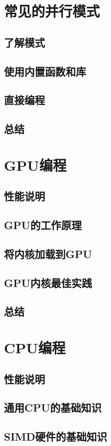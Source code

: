 \documentclass[11pt,a4paper,UTF8]{ctexart}
\begin{document}
	\section{常见的并行模式}
		\subsection{了解模式}
		\subsection{使用内置函数和库}
		\subsection{直接编程}
		\subsection{总结}
	\section{GPU编程}
		\subsection{性能说明}
		\subsection{GPU的工作原理}
		\subsection{将内核加载到GPU}
		\subsection{GPU内核最佳实践}
		\subsection{总结}
	\section{CPU编程}
		\subsection{性能说明}
		\subsection{通用CPU的基础知识}
		\subsection{SIMD硬件的基础知识}
\end{document}
